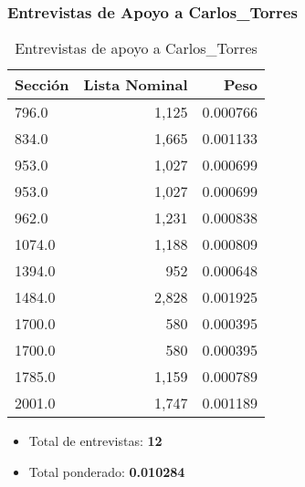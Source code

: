 \documentclass[a4paper,12pt]{article}
\begin{document}
\subsubsection*{Entrevistas de Apoyo a Carlos_Torres}
\begin{table}[h]
\centering
\begin{tabular}{lrr}
\toprule
Sección & Lista Nominal & Peso \\ \midrule
796.0 & 1,125 & 0.000766 \\ 
834.0 & 1,665 & 0.001133 \\ 
953.0 & 1,027 & 0.000699 \\ 
953.0 & 1,027 & 0.000699 \\ 
962.0 & 1,231 & 0.000838 \\ 
1074.0 & 1,188 & 0.000809 \\ 
1394.0 & 952 & 0.000648 \\ 
1484.0 & 2,828 & 0.001925 \\ 
1700.0 & 580 & 0.000395 \\ 
1700.0 & 580 & 0.000395 \\ 
1785.0 & 1,159 & 0.000789 \\ 
2001.0 & 1,747 & 0.001189 \\ 
\bottomrule
\end{tabular}
\caption{Entrevistas de apoyo a Carlos_Torres}
\end{table}

\begin{itemize}
\item Total de entrevistas: \textbf{12}
\item Total ponderado: \textbf{0.010284}
\end{itemize}
\end{document}
